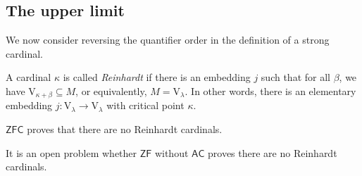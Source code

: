 \subsection{The upper limit}
We now consider reversing the quantifier order in the definition of a strong cardinal.
\begin{definition}
    A cardinal \( \kappa \) is called \emph{Reinhardt} if there is an embedding \( j \) such that for all \( \beta \), we have \( \mathrm{V}_{\kappa + \beta} \subseteq M \), or equivalently, \( M = \mathrm{V}_\lambda \).
    In other words, there is an elementary embedding \( j : \mathrm{V}_\lambda \to \mathrm{V}_\lambda \) with critical point \( \kappa \).
\end{definition}
\begin{theorem}[Kunen]
    \( \mathsf{ZFC} \) proves that there are no Reinhardt cardinals.
\end{theorem}
It is an open problem whether \( \mathsf{ZF} \) without \( \mathsf{AC} \) proves there are no Reinhardt cardinals.
